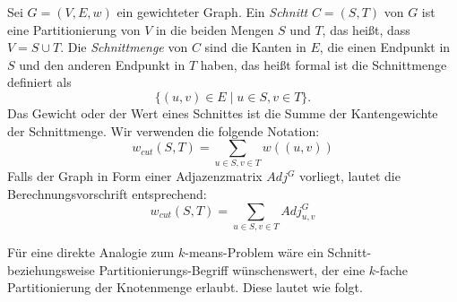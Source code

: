 \begin{definition}
	Sei $G=(V,E,w)$ ein gewichteter Graph. Ein \emph{Schnitt} $C=(S,T)$ von $G$ ist eine Partitionierung von $V$ in die beiden
	Mengen $S$ und $T$, das heißt, dass $V = S \cup T$. Die \emph{Schnittmenge} von $C$ sind die Kanten in $E$, die einen
	Endpunkt in $S$ und den anderen Endpunkt in $T$ haben, das heißt formal ist die Schnittmenge definiert als
	\[ \{ (u,v) \in E \mid u \in S, v \in T \}. \]
	Das Gewicht oder der Wert eines Schnittes ist die Summe der Kantengewichte der Schnittmenge. Wir verwenden die folgende
	Notation:
	\[ w_{cut}(S,T) = \sum_{u \in S, v \in T} w((u,v)) \]
	Falls der Graph in Form einer Adjazenzmatrix $Adj^G$ vorliegt, lautet die Berechnungsvorschrift entsprechend:
	\[ w_{cut}(S,T) = \sum_{u \in S, v \in T} Adj^G_{u,v} \]
\end{definition}
Für eine direkte Analogie zum $k$-means-Problem wäre ein Schnitt- beziehungsweise Partitionierungs-Begriff wünschenswert,
der eine $k$-fache Partitionierung der Knotenmenge erlaubt. Diese lautet wie folgt.

